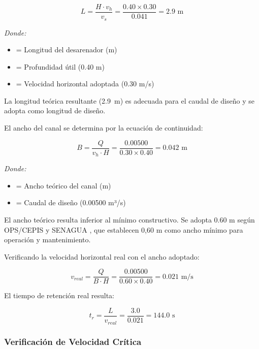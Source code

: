 \documentclass[12pt,a4paper]{article}
\begin{document}
\begin{equation}
L = \frac{H \cdot v_h}{v_s} = \frac{0.40 \times 0.30}{0.041} = 2.9 \text{ m}
\end{equation}

\textit{Donde:}
\begin{itemize}[noitemsep,leftmargin=2em]
    \item[$L$] = Longitud del desarenador (m)
    \item[$H$] = Profundidad útil (0.40 m)
    \item[$v_h$] = Velocidad horizontal adoptada (0.30 m/s)
\end{itemize}

La longitud teórica resultante (2.9~m) es adecuada para el caudal de diseño y se adopta como longitud de diseño.

El ancho del canal se determina por la ecuación de continuidad:

\begin{equation}
B = \frac{Q}{v_h \cdot H} = \frac{0.00500}{0.30 \times 0.40} = 0.042 \text{ m}
\end{equation}

\textit{Donde:}
\begin{itemize}[noitemsep,leftmargin=2em]
    \item[$B$] = Ancho teórico del canal (m)
    \item[$Q$] = Caudal de diseño (0.00500 m³/s)
\end{itemize}

El ancho teórico resulta inferior al mínimo constructivo. Se adopta 0.60 m según OPS/CEPIS \cite{ops2005} y SENAGUA \cite{senagua2012}, que establecen 0,60 m como ancho mínimo para operación y mantenimiento.

Verificando la velocidad horizontal real con el ancho adoptado:

\begin{equation}
v_{real} = \frac{Q}{B \cdot H} = \frac{0.00500}{0.60 \times 0.40} = 0.021 \text{ m/s}
\end{equation}

El tiempo de retención real resulta:

\begin{equation}
t_r = \frac{L}{v_{real}} = \frac{3.0}{0.021} = 144.0 \text{ s}
\end{equation}

\subsubsection{Verificación de Velocidad Crítica}
\end{document}
